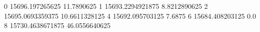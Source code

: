 0 15696.197265625 11.7890625
1 15693.2294921875 8.8212890625
2 15695.0693359375 10.6611328125
4 15692.095703125 7.6875
6 15684.408203125 0.0
8 15730.4638671875 46.0556640625
